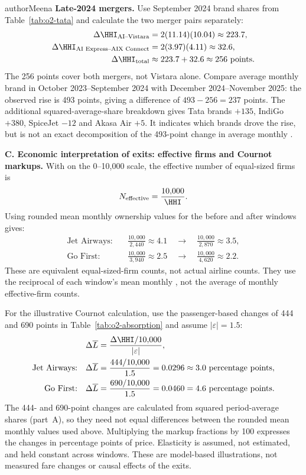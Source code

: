 \begin{mergedcontribution}{authorMeena}
\textbf{Late-2024 mergers.} Use September 2024 brand shares from Table~\ref{tab:o2-tata} and calculate the two merger pairs separately:
\[
\begin{aligned}
\Delta\HHI_{\text{AI--Vistara}} &= 2(11.14)(10.04) \approx 223.7,\\
\Delta\HHI_{\text{AI Express--AIX Connect}} &= 2(3.97)(4.11) \approx 32.6,\\
\Delta\HHI_{\text{total}} &\approx 223.7+32.6 \approx 256\text{ points}.
\end{aligned}
\]
The 256 points cover both mergers, not Vistara alone. Compare average monthly brand \HHI{} in October 2023--September 2024 with December 2024--November 2025: the observed rise is 493 points, giving a difference of $493-256=237$ points. The additional squared-average-share breakdown gives Tata brands $+135$, IndiGo $+380$, SpiceJet $-12$ and Akasa Air $+5$. It indicates which brands drove the rise, but is not an exact decomposition of the 493-point change in average monthly \HHI{}.

\textbf{C. Economic interpretation of exits: effective firms and Cournot markups.}
With \HHI{} on the 0--10,000 scale, the effective number of equal-sized firms is
\[
N_{\text{effective}}=\frac{10{,}000}{\HHI}.
\]
Using rounded mean monthly ownership \HHI{} values for the before and after windows gives:
\[
\begin{aligned}
\text{Jet Airways:}\quad &\frac{10{,}000}{2{,}440}\approx4.1
\quad\longrightarrow\quad\frac{10{,}000}{2{,}870}\approx3.5,\\
\text{Go First:}\quad &\frac{10{,}000}{3{,}940}\approx2.5
\quad\longrightarrow\quad\frac{10{,}000}{4{,}620}\approx2.2.
\end{aligned}
\]
These are equivalent equal-sized-firm counts, not actual airline counts. They use the reciprocal of each window's mean monthly \HHI{}, not the average of monthly effective-firm counts.

For the illustrative Cournot calculation, use the passenger-based \HHI{} changes of 444 and 690 points in Table~\ref{tab:o2-absorption} and assume $|\varepsilon|=1.5$:
\[
\begin{aligned}
\Delta\overline{L}&=\frac{\Delta\HHI/10{,}000}{|\varepsilon|},\\
\text{Jet Airways:}\quad \Delta\overline{L}&=\frac{444/10{,}000}{1.5}
=0.0296\approx3.0\text{ percentage points},\\
\text{Go First:}\quad \Delta\overline{L}&=\frac{690/10{,}000}{1.5}
=0.0460=4.6\text{ percentage points}.
\end{aligned}
\]
The 444- and 690-point changes are calculated from squared period-average shares (part~A), so they need not equal differences between the rounded mean monthly \HHI{} values used above. Multiplying the markup fractions by 100 expresses the changes in percentage points of price. Elasticity is assumed, not estimated, and held constant across windows. These are model-based illustrations, not measured fare changes or causal effects of the exits.
\end{mergedcontribution}

